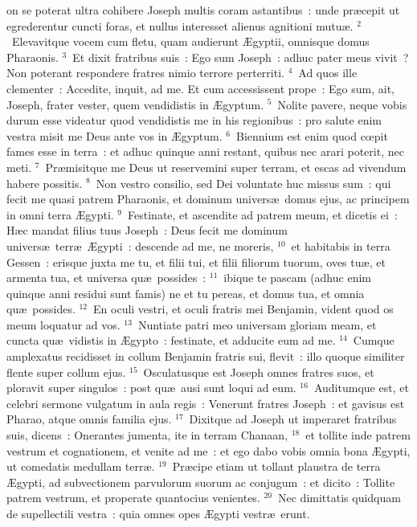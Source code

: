 \bchapter
{}on se poterat ultra cohibere Joseph multis coram astantibus~: unde pr\ae cepit ut egrederentur cuncti foras, et nullus interesset alienus agnitioni mutu\ae .
${}^{2}$~Elevavitque vocem cum fletu, quam audierunt \AE gyptii, omnisque domus Pharaonis.
${}^{3}$~Et dixit fratribus suis~: Ego sum Joseph~: adhuc pater meus vivit~? Non poterant respondere fratres nimio terrore perterriti.
${}^{4}$~Ad quos ille clementer~: Accedite, inquit, ad me. Et cum accessissent prope~: Ego sum, ait, Joseph, frater vester, quem vendidistis in \AE gyptum.
${}^{5}$~Nolite pavere, neque vobis durum esse videatur quod vendidistis me in his regionibus~: pro salute enim vestra misit me Deus ante vos in \AE gyptum.
${}^{6}$~Biennium est enim quod cœpit fames esse in terra~: et adhuc quinque anni restant, quibus nec arari poterit, nec meti.
${}^{7}$~Pr\ae misitque me Deus ut reservemini super terram, et escas ad vivendum habere possitis.
${}^{8}$~Non vestro consilio, sed Dei voluntate huc missus sum~: qui fecit me quasi patrem Pharaonis, et dominum univers\ae\ domus ejus, ac principem in omni terra \AE gypti.
${}^{9}$~Festinate, et ascendite ad patrem meum, et dicetis ei~: H\ae c mandat filius tuus Joseph~: Deus fecit me dominum univers\ae\ terr\ae\ \AE gypti~: descende ad me, ne moreris,
${}^{10}$~et habitabis in terra Gessen~: erisque juxta me tu, et filii tui, et filii filiorum tuorum, oves tu\ae , et armenta tua, et universa qu\ae\ possides~:
${}^{11}$~ibique te pascam (adhuc enim quinque anni residui sunt famis) ne et tu pereas, et domus tua, et omnia qu\ae\ possides.
${}^{12}$~En oculi vestri, et oculi fratris mei Benjamin, vident quod os meum loquatur ad vos.
${}^{13}$~Nuntiate patri meo universam gloriam meam, et cuncta qu\ae\ vidistis in \AE gypto~: festinate, et adducite eum ad me.
${}^{14}$~Cumque amplexatus recidisset in collum Benjamin fratris sui, flevit~: illo quoque similiter flente super collum ejus.
${}^{15}$~Osculatusque est Joseph omnes fratres suos, et ploravit super singulos~: post qu\ae\ ausi sunt loqui ad eum.
${}^{16}$~Auditumque est, et celebri sermone vulgatum in aula regis~: Venerunt fratres Joseph~: et gavisus est Pharao, atque omnis familia ejus.
${}^{17}$~Dixitque ad Joseph ut imperaret fratribus suis, dicens~: Onerantes jumenta, ite in terram Chanaan,
${}^{18}$~et tollite inde patrem vestrum et cognationem, et venite ad me~: et ego dabo vobis omnia bona \AE gypti, ut comedatis medullam terr\ae .
${}^{19}$~Pr\ae cipe etiam ut tollant plaustra de terra \AE gypti, ad subvectionem parvulorum suorum ac conjugum~: et dicito~: Tollite patrem vestrum, et properate quantocius venientes.
${}^{20}$~Nec dimittatis quidquam de supellectili vestra~: quia omnes opes \AE gypti vestr\ae\ erunt.


